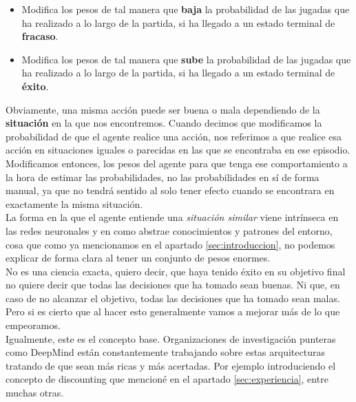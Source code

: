 \documentclass[11pt,fleqn]{book} %
\begin{document}
\begin{itemize}
	\item Modifica los pesos de tal manera que \textbf{baja} la probabilidad de las jugadas que ha realizado a lo largo de la partida, si ha llegado a un estado terminal de \textbf{fracaso}. \\
	
	\item Modifica los pesos de tal manera que \textbf{sube} la probabilidad de las jugadas que ha realizado a lo largo de la partida, si ha llegado a un estado terminal de \textbf{éxito}. \\
\end{itemize}

Obviamente, una misma acción puede ser buena o mala dependiendo de la \textbf{situación} en la que nos encontremos. Cuando decimos que modificamos la probabilidad de que el agente realice una acción, nos referimos a que realice esa acción en situaciones iguales o parecidas en las que se encontraba en ese episodio. \\

Modificamos entonces, los pesos del agente para que tenga ese comportamiento a la hora de estimar las probabilidades, no las probabilidades en sí de forma manual, ya que no tendrá sentido al solo tener efecto cuando se encontrara en exactamente la misma situación.\\

La forma en la que el agente entiende una \textit{situación similar} viene intrínseca en las redes neuronales y en como abstrae conocimientos y patrones del entorno, cosa que como ya mencionamos en el apartado \ref{sec:introduccion}, no podemos explicar de forma clara al tener un conjunto de pesos enormes. \\

No es una ciencia exacta, quiero decir, que haya tenido éxito en su objetivo final no quiere decir que todas las decisiones que ha tomado sean buenas. Ni que, en caso de no alcanzar el objetivo, todas las decisiones que ha tomado sean malas. Pero si es cierto que al hacer esto generalmente vamos a mejorar más de lo que empeoramos. \\

Igualmente, este es el concepto base. Organizaciones de investigación punteras como DeepMind están constantemente trabajando sobre estas arquitecturas tratando de que sean más ricas y más acertadas. Por ejemplo introduciendo el concepto de discounting que mencioné en el apartado \ref{sec:experiencia}, entre muchas otras. \\
\end{document}
